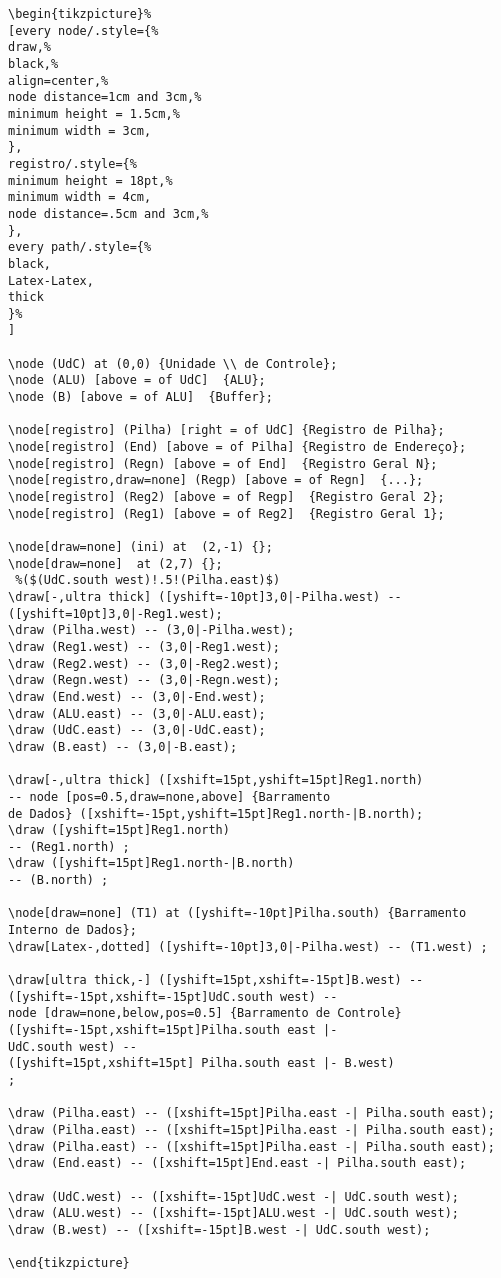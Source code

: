 \begin{verbatim}
\begin{tikzpicture}%
[every node/.style={%
draw,%
black,%
align=center,%
node distance=1cm and 3cm,%
minimum height = 1.5cm,%
minimum width = 3cm,
},
registro/.style={%
minimum height = 18pt,%
minimum width = 4cm,
node distance=.5cm and 3cm,%
},
every path/.style={%
black,
Latex-Latex,
thick
}%
]

\node (UdC) at (0,0) {Unidade \\ de Controle};
\node (ALU) [above = of UdC]  {ALU};
\node (B) [above = of ALU]  {Buffer};

\node[registro] (Pilha) [right = of UdC] {Registro de Pilha};
\node[registro] (End) [above = of Pilha] {Registro de Endereço};
\node[registro] (Regn) [above = of End]  {Registro Geral N};
\node[registro,draw=none] (Regp) [above = of Regn]  {...};
\node[registro] (Reg2) [above = of Regp]  {Registro Geral 2};
\node[registro] (Reg1) [above = of Reg2]  {Registro Geral 1};
 
\node[draw=none] (ini) at  (2,-1) {};
\node[draw=none]  at (2,7) {};
 %($(UdC.south west)!.5!(Pilha.east)$)
\draw[-,ultra thick] ([yshift=-10pt]3,0|-Pilha.west) -- ([yshift=10pt]3,0|-Reg1.west);
\draw (Pilha.west) -- (3,0|-Pilha.west);
\draw (Reg1.west) -- (3,0|-Reg1.west); 
\draw (Reg2.west) -- (3,0|-Reg2.west);
\draw (Regn.west) -- (3,0|-Regn.west);
\draw (End.west) -- (3,0|-End.west);  
\draw (ALU.east) -- (3,0|-ALU.east);  
\draw (UdC.east) -- (3,0|-UdC.east);  
\draw (B.east) -- (3,0|-B.east);  

\draw[-,ultra thick] ([xshift=15pt,yshift=15pt]Reg1.north)
-- node [pos=0.5,draw=none,above] {Barramento 
de Dados} ([xshift=-15pt,yshift=15pt]Reg1.north-|B.north);
\draw ([yshift=15pt]Reg1.north)
-- (Reg1.north) ;
\draw ([yshift=15pt]Reg1.north-|B.north)
-- (B.north) ;

\node[draw=none] (T1) at ([yshift=-10pt]Pilha.south) {Barramento Interno de Dados};
\draw[Latex-,dotted] ([yshift=-10pt]3,0|-Pilha.west) -- (T1.west) ;

\draw[ultra thick,-] ([yshift=15pt,xshift=-15pt]B.west) --
([yshift=-15pt,xshift=-15pt]UdC.south west) --
node [draw=none,below,pos=0.5] {Barramento de Controle}
([yshift=-15pt,xshift=15pt]Pilha.south east |- 
UdC.south west) --
([yshift=15pt,xshift=15pt] Pilha.south east |- B.west) 
;

\draw (Pilha.east) -- ([xshift=15pt]Pilha.east -| Pilha.south east);
\draw (Pilha.east) -- ([xshift=15pt]Pilha.east -| Pilha.south east);
\draw (Pilha.east) -- ([xshift=15pt]Pilha.east -| Pilha.south east);
\draw (End.east) -- ([xshift=15pt]End.east -| Pilha.south east);

\draw (UdC.west) -- ([xshift=-15pt]UdC.west -| UdC.south west);
\draw (ALU.west) -- ([xshift=-15pt]ALU.west -| UdC.south west);
\draw (B.west) -- ([xshift=-15pt]B.west -| UdC.south west);

\end{tikzpicture}
\end{verbatim}




